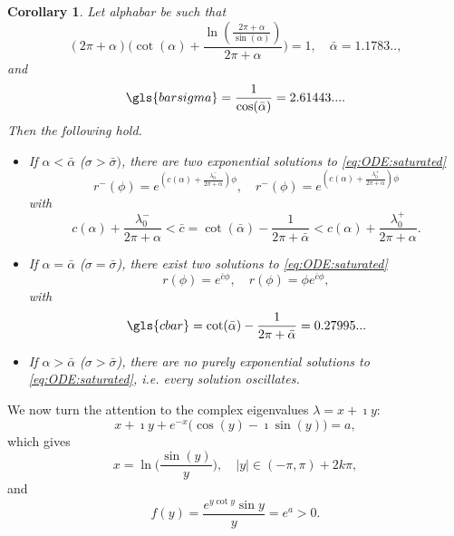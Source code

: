 \documentclass[reqno]{amsart}
\theoremstyle{definition} \newtheorem{definition}{Definition}[section]
\theoremstyle{definition} \newtheorem{remark}[definition]{Remark}
\theoremstyle{plain} \newtheorem{lemma}[definition]{Lemma}
\theoremstyle{plain} \newtheorem{proposition}[definition]{Proposition}
\theoremstyle{plain} \newtheorem{theorem}[definition]{Theorem}
\theoremstyle{plain} \newtheorem{corollary}[definition]{Corollary}
\theoremstyle{definition} \newtheorem{example}[definition]{Example}
\theoremstyle{plain} \newtheorem{claim}[clai]{Claim}
\theoremstyle{definition} \newtheorem{assumption}[definition]{Assumption}
\theoremstyle{definition} \newtheorem{observation}[definition]{Observation}
\newcommand{\R}{\mathbb{R}}
\newcommand{\1}{\mathbbm 1}
\renewcommand{\i}{\imath}
\numberwithin{equation}{section} %
\theoremstyle{plain} \newtheorem*{theorem*}{Theorem}
\theoremstyle{plain} \newtheorem{mthm}[maintheorem]{Main Theorem}
\theoremstyle{plain} \newtheorem*{mthm*}{Main Theorem}
\theoremstyle{plain} \newtheorem*{conjecture*}{Conjecture}
\theoremstyle{plain} \newtheorem{conjecture}[definition]{Conjecture}
\theoremstyle{plain} \newtheorem*{problem*}{Problem}
\begin{document}
\begin{corollary}
\label{Cor:eigen_angle}
Let \gls{alphabar} be such that
\begin{equation*}
(2\pi +\alpha) \bigg( \cot(\alpha) + \frac{\ln(\frac{2\pi + \alpha}{\sin(\alpha)})}{2\pi + \alpha} \bigg) = 1, \quad \bar \alpha = 1.1783..,
\end{equation*}
and
\begin{equation*}
\gls{barsigma} = \frac{1}{\cos(\bar \alpha)} = 2.61443....
\end{equation*}
Then the following hold.
\begin{itemize}
\item %
If $ \alpha < \bar \alpha$ ($\sigma > \bar \sigma)$, there are two exponential solutions to \eqref{eq:ODE:saturated}
\begin{equation*}
r^-(\phi) = e^{(c(\alpha) + \frac{\lambda^-_0}{2\pi + \alpha}) \phi}, \quad r^-(\phi) = e^{(c(\alpha) + \frac{\lambda^+_0}{2\pi + \alpha}) \phi}
\end{equation*}
with
$$
c(\alpha) + \frac{\lambda^-_0}{2\pi + \alpha} < \bar c = \cot(\bar \alpha) - \frac{1}{2\pi + \bar \alpha} < c(\alpha) + \frac{\lambda^+_0}{2\pi + \alpha}.
$$
\item If $\alpha = \bar \alpha$ ($\sigma = \bar \sigma$), there exist two solutions to \eqref{eq:ODE:saturated}
\begin{equation*}
r(\phi) = e^{\bar c \phi}, \quad r(\phi) = \phi e^{\bar c \phi},
\end{equation*}
with 
$$
\gls{cbar} = \cot(\bar \alpha) - \frac{1}{2\pi + \bar \alpha} = 0.27995...
$$
\item If $\alpha > \bar \alpha$ ($\sigma > \bar \sigma$), there are no purely exponential solutions to  \eqref{eq:ODE:saturated}, i.e. every solution oscillates.
\end{itemize}
\end{corollary}

We now turn the attention to the complex eigenvalues $\lambda = x + \i y$: %
\begin{equation*}
x + \i y + e^{-x} \big( \cos(y) - \i \sin(y) \big) = a,
\end{equation*}
which gives
\begin{equation}
\label{Equa:real_complex_eig}
x = \ln \bigg( \frac{\sin(y)}{y} \bigg), \quad |y| \in (-\pi,\pi) + 2k\pi,
\end{equation}
and
\begin{equation}
\label{Equa:eigenvl_ima_1}
f(y) = \frac{e^{y \cot y} \sin y}{y} = e^a > 0.
\end{equation}
\end{document}

